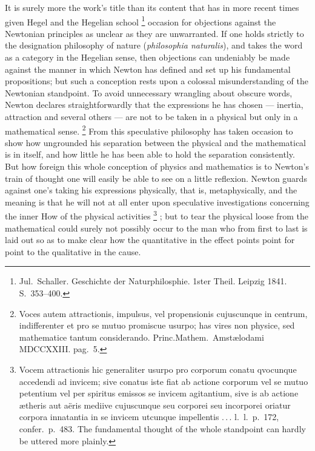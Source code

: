 \documentclass[12pt,a4paper]{book}
\renewcommand{\thefootnote}{*)}
\begin{document}
It is surely more the work's title than its content that has in more recent times given Hegel and the Hegelian
school%
\footnote{%
Jul.\ Schaller. Geschichte der Naturphilosphie. 1ster Theil.
Leipzig 1841. S.\ 353--400.}
occasion for objections against the Newtonian principles as unclear as they are unwarranted. If one holds
strictly to the designation philosophy of nature (\textit{philosophia naturalis}), and takes the word as a
category in the Hegelian sense, then objections can undeniably be made against the manner in which Newton has
defined and set up his fundamental propositions; but such a conception rests upon a colossal
misunderstanding of the Newtonian standpoint. To avoid unnecessary wrangling about obscure words, Newton
declares straightforwardly that the expressions he has chosen --- inertia, attraction and several others ---
are not to be taken in a physical but only in a mathematical sense.%
\renewcommand{\thefootnote}{**)}%
\footnote{%
Voces autem attractionis, impulsus, vel propensionis cujuscunque in centrum, indifferenter et pro se mutuo
promiscue usurpo; has vires non physice, sed mathematice tantum considerando. Princ.Mathem.\ Amstælodami
MDCCXXIII. pag.\ 5.}%
\renewcommand{\thefootnote}{*)}
From this speculative philosophy has taken occasion to show how ungrounded his separation between the
physical and the mathematical is in itself, and how little he has been able to hold the separation
consistently. But how foreign this whole conception of physics and mathematics is to Newton's train of
thought one will easily be able to see on a little reflexion. Newton guards against one's taking his
expressions physically, that is, metaphysically, and the meaning is that he will not at all enter upon
speculative investigations
concerning the inner How of the physical activities%
\footnote{%
Vocem attractionis hic generaliter usurpo pro corporum conatu qvocunque accedendi ad invicem; sive conatus
iste fiat ab actione corporum vel se mutuo petentium vel per spiritus emissos se invicem agitantium, sive is
ab actione ætheris aut aëris mediive cujuscunque seu corporei seu incorporei oriatur corpora innatantia in se
invicem
utcunque impellentis .\,.\,. l.\ l.\ p.\ 172, confer.\ p.\ 483.
The fundamental thought of the whole standpoint can hardly be uttered more plainly.}%
; but to tear the physical loose from the mathematical could surely not possibly occur to the man who from
first to last is laid out so as to make clear how the quantitative in the effect points point for point to the
qualitative in the cause.
\end{document}
